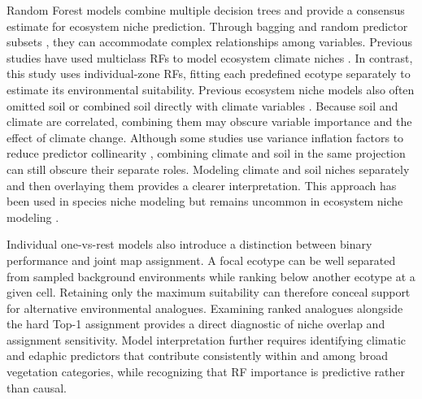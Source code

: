 \documentclass[11pt]{article}
\begin{document}
Random Forest models \citep{breiman2001} combine multiple decision trees and provide a consensus estimate for ecosystem niche prediction. Through bagging and random predictor subsets \citep{amit1997,ho1998}, they can accommodate complex relationships among variables. Previous studies have used multiclass RFs to model ecosystem climate niches \citep{rehfeldt2012,robertsHamann2012,wang2012}. In contrast, this study uses individual-zone RFs, fitting each predefined ecotype separately to estimate its environmental suitability. Previous ecosystem niche models also often omitted soil or combined soil directly with climate variables \citep{nakazato2010}. Because soil and climate are correlated, combining them may obscure variable importance and the effect of climate change. Although some studies use variance inflation factors to reduce predictor collinearity \citep{namitha2022}, combining climate and soil in the same projection can still obscure their separate roles. Modeling climate and soil niches separately and then overlaying them provides a clearer interpretation. This approach has been used in species niche modeling but remains uncommon in ecosystem niche modeling \citep{feng2020}.

Individual one-vs-rest models also introduce a distinction between binary
performance and joint map assignment. A focal ecotype can be well separated
from sampled background environments while ranking below another ecotype at a
given cell. Retaining only the maximum suitability can therefore conceal
support for alternative environmental analogues. Examining ranked analogues
alongside the hard Top-1 assignment provides a direct diagnostic of niche
overlap and assignment sensitivity. Model interpretation further requires
identifying climatic and edaphic predictors that contribute consistently
within and among broad vegetation categories, while recognizing that RF
importance is predictive rather than causal.
\end{document}
